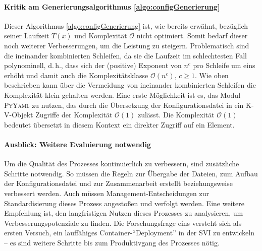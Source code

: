 \paragraph{Kritik am Generierungsalgorithmus \ref{algo:configGenerierung}} Dieser Algorithmus \vref{algo:configGenerierung} ist, wie bereits erwähnt, bezüglich seiner Laufzeit $T(x)$ und Komplexität $\mathcal{O}$ nicht optimiert. Somit bedarf dieser noch weiterer Verbesserungen, um die Leistung zu steigern. Problematisch sind die ineinander kombinierten Schleifen, da sie die Laufzeit im schlechtesten Fall polynominell, d.\,h., dass sich der (positive) Exponent von $n^{c}$ pro Schleife um eins erhöht und damit auch die Komplexitätsklasse $\mathcal{O}(n^{c}),\,c \ge 1$. Wie oben beschrieben kann über die Vermeidung von ineinander kombinierten Schleifen die Komplexität klein gehalten werden. Eine erste Möglichkeit ist es, das Modul \textsc{PyYaml} zu nutzen, das durch die Übersetzung der Konfigurationsdatei in ein \ac{K-V}-Objekt Zugriffe der Komplexität $\mathcal{O}(1)$ zulässt. Die Komplexität $\mathcal{O}(1)$ bedeutet übersetzt in diesem Kontext ein direkter Zugriff auf ein Element.

\paragraph{Ausblick: Weitere Evaluierung notwendig} Um die Qualität des Prozesses kontinuierlich zu verbessern, sind zusätzliche Schritte notwendig. So müssen die Regeln zur Übergabe der Dateien, zum Aufbau der Konfigurationsdatei und zur Zusammenarbeit erstellt beziehungsweise verbessert werden. Auch müssen Management-Entscheidungen zur Standardisierung dieses Prozess angestoßen und verfolgt werden. Eine weitere Empfehlung ist, den langfristigen Nutzen dieses Prozesses zu analysieren, um Verbesserungspotenziale zu finden. Die Forschungsfrage eins versteht sich als ersten Versuch, ein lauffähiges Container-\enquote{Deployment} in der \ac{SVI} zu entwickeln -- es sind weitere Schritte bis zum Produktivgang des Prozesses nötig.